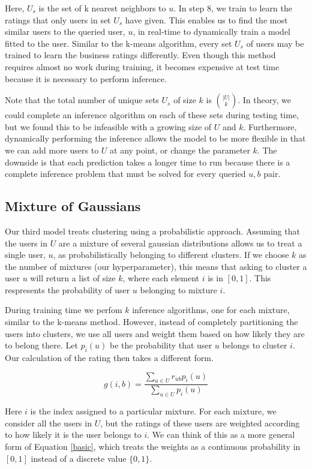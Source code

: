 \documentclass[11pt]{article}
\begin{document}
Here, $U_s$ is the set of k nearest neighbors to $u$. In step 8, we train to learn the ratings that only users in set $U_s$ have given. This enables us to find the most similar users to the queried user, $u$, in real-time to dynamically train a model fitted to the user. Similar to the k-means algorithm, every set $U_s$ of users may be trained to learn the business ratings differently. Even though this method requires almost no work during training, it becomes expensive at test time because it is necessary to perform inference.

Note that the total number of unique sets $U_s$ of size $k$ is $|U| \choose k$. In theory, we could complete an inference algorithm on each of these sets during testing time, but we found this to be infeasible with a growing size of $U$ and $k$. Furthermore, dynamically performing the inference allows the model to be more flexible in that we can add more users to $U$ at any point, or change the parameter $k$. The downside is that each prediction takes a longer time to run because there is a complete inference problem that must be solved for every queried $u, b$ pair. 

\subsection{Mixture of Gaussians}
Our third model treats clustering using a probabilistic approach. Assuming that the users in $U$ are a mixture of several gaussian distributions allows us to treat a single user, $u$, as probabilistically belonging to different clusters. If we choose $k$ as the number of mixtures (our hyperparameter), this means that asking to cluster a user $u$ will return a list of size $k$, where each element $i$ is in $[0, 1]$. This respresents the probability of user $u$ belonging to mixture $i$.

During training time we perfom $k$ inference algorithms, one for each mixture, similar to the k-means method. However, instead of completely partitioning the users into clusters, we use all users and weight them based on how likely they are to belong there. Let $p_i(u)$ be the probability that user $u$ belongs to cluster $i$. Our calculation of the rating then takes a different form.

\begin{equation}
\label{weighted}
g(i, b) = \frac{\sum\limits_{u \in U} r_{ub}p_i(u)}{\sum\limits_{u \in U} p_i(u)}
\end{equation}

Here $i$ is the index assigned to a particular mixture. For each mixture, we consider all the users in $U$, but the ratings of these users are weighted according to how likely it is the user belongs to $i$. We can think of this as a more general form of Equation \eqref{basic}, which treats the weights as a continuous probability in $[0, 1]$ instead of a discrete value $\{0, 1\}$.
\end{document}
